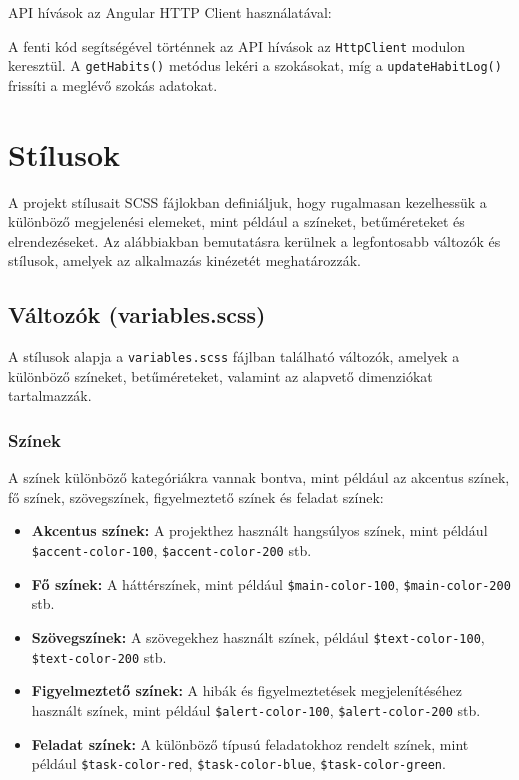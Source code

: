 \documentclass[12pt]{report}
\begin{document}
API hívások az Angular HTTP Client használatával:




A fenti kód segítségével történnek az API hívások az \texttt{HttpClient} modulon keresztül. A \texttt{getHabits()} metódus lekéri a szokásokat, míg a \texttt{updateHabitLog()} frissíti a meglévő szokás adatokat.


\section{Stílusok}

A projekt stílusait SCSS fájlokban definiáljuk, hogy rugalmasan kezelhessük a különböző megjelenési elemeket, mint például a színeket, betűméreteket és elrendezéseket. Az alábbiakban bemutatásra kerülnek a legfontosabb változók és stílusok, amelyek az alkalmazás kinézetét meghatározzák.

\subsection{Változók (variables.scss)}

A stílusok alapja a \texttt{variables.scss} fájlban található változók, amelyek a különböző színeket, betűméreteket, valamint az alapvető dimenziókat tartalmazzák.

\subsubsection{Színek}
A színek különböző kategóriákra vannak bontva, mint például az akcentus színek, fő színek, szövegszínek, figyelmeztető színek és feladat színek:

\begin{itemize}
    \item \textbf{Akcentus színek:} A projekthez használt hangsúlyos színek, mint például \texttt{\$accent-color-100}, \texttt{\$accent-color-200} stb.
    \item \textbf{Fő színek:} A háttérszínek, mint például \texttt{\$main-color-100}, \texttt{\$main-color-200} stb.
    \item \textbf{Szövegszínek:} A szövegekhez használt színek, például \texttt{\$text-color-100}, \texttt{\$text-color-200} stb.
    \item \textbf{Figyelmeztető színek:} A hibák és figyelmeztetések megjelenítéséhez használt színek, mint például \texttt{\$alert-color-100}, \texttt{\$alert-color-200} stb.
    \item \textbf{Feladat színek:} A különböző típusú feladatokhoz rendelt színek, mint például \texttt{\$task-color-red}, \texttt{\$task-color-blue}, \texttt{\$task-color-green}.
\end{itemize}
\end{document}
